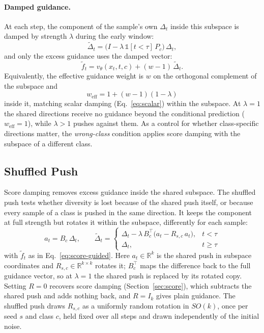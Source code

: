 \documentclass[sigconf,nonacm]{acmart}
\newcommand{\Dt}{\Delta_t}
\newcommand{\ind}[1]{\mathbb{1}[#1]}
\begin{document}
\paragraph{Damped guidance.}
At each step, the component of the sample's own $\Dt$ inside this subspace is damped by strength $\lambda$ during the early window:
\begin{equation}
  \tilde{\Delta}_t = \big(I - \lambda\, \ind{t < \tau}\, P_c\big)\, \Dt ,
  \label{eq:score-damp}
\end{equation}
and only the excess guidance uses the damped vector:
\begin{equation}
  \tilde{f}_t = v_\theta(x_t, t, c) + (w-1)\,\tilde{\Delta}_t .
  \label{eq:score-guided}
\end{equation}
Equivalently, the effective guidance weight is $w$ on the orthogonal complement of the subspace and
\begin{equation}
  w_{\text{eff}} = 1 + (w-1)(1-\lambda)
  \label{eq:weff}
\end{equation}
inside it, matching scalar damping (Eq.~\eqref{eq:scalar}) within the subspace. At $\lambda = 1$ the shared directions receive no guidance beyond the conditional prediction ($w_{\text{eff}} = 1$), while $\lambda > 1$ pushes against them. As a control for whether class-specific directions matter, the \emph{wrong-class} condition applies score damping with the subspace of a different class.

\subsection{Shuffled Push}
\label{sec:shuffled}

Score damping removes excess guidance inside the shared subspace. The shuffled push tests whether diversity is lost because of the shared push itself, or because every sample of a class is pushed in the same direction. It keeps the component at full strength but rotates it within the subspace, differently for each sample:
\begin{equation}
  a_t = B_c\,\Dt, \qquad
  \tilde{\Delta}_t = \begin{cases} \Dt - \lambda\,B_c^{\top}\big(a_t - R_{s,c}\,a_t\big), & t < \tau \\ \Dt, & t \ge \tau \end{cases}
  \label{eq:shuffled}
\end{equation}
with $\tilde{f}_t$ as in Eq.~\eqref{eq:score-guided}. Here $a_t \in \mathbb{R}^k$ is the shared push in subspace coordinates and $R_{s,c} \in \mathbb{R}^{k \times k}$ rotates it; $B_c^{\top}$ maps the difference back to the full guidance vector, so at $\lambda = 1$ the shared push is replaced by its rotated copy. Setting $R = 0$ recovers score damping (Section~\ref{sec:score}), which subtracts the shared push and adds nothing back, and $R = I_k$ gives plain guidance. The shuffled push draws $R_{s,c}$ as a uniformly random rotation in $SO(k)$, once per seed $s$ and class $c$, held fixed over all steps and drawn independently of the initial noise.
\end{document}
